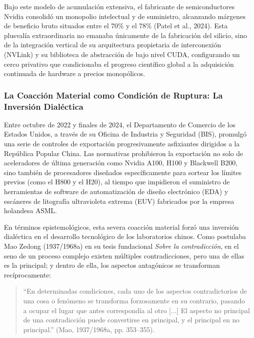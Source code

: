 Bajo este modelo de acumulación extensiva, el fabricante de semiconductores Nvidia consolidó un monopolio intelectual y de suministro, alcanzando márgenes de beneficio bruto situados entre el 70\% y el 78\% (Patel et al., 2024). Esta plusvalía extraordinaria no emanaba únicamente de la fabricación del silicio, sino de la integración vertical de su arquitectura propietaria de interconexión (NVLink) y su biblioteca de abstracción de bajo nivel CUDA, configurando un cerco privativo que condicionaba el progreso científico global a la adquisición continuada de hardware a precios monopólicos.

\subsubsection{La Coacción Material como Condición de Ruptura: La Inversión Dialéctica}

Entre octubre de 2022 y finales de 2024, el Departamento de Comercio de los Estados Unidos, a través de su Oficina de Industria y Seguridad (BIS), promulgó una serie de controles de exportación progresivamente asfixiantes dirigidos a la República Popular China. Las normativas prohibieron la exportación no solo de aceleradores de última generación como Nvidia A100, H100 y Blackwell B200, sino también de procesadores diseñados específicamente para sortear los límites previos (como el H800 y el H20), al tiempo que impidieron el suministro de herramientas de software de automatización de diseño electrónico (EDA) y escáneres de litografía ultravioleta extrema (EUV) fabricados por la empresa holandesa ASML.

En términos epistemológicos, esta severa coacción material forzó una inversión dialéctica en el desarrollo tecnológico de los laboratorios chinos. Como postulaba Mao Zedong (1937/1968a) en su tesis fundacional \textit{Sobre la contradicción}, en el seno de un proceso complejo existen múltiples contradicciones, pero una de ellas es la principal; y dentro de ella, los aspectos antagónicos se transforman recíprocamente:

\begin{quote}
``En determinadas condiciones, cada uno de los aspectos contradictorios de una cosa o fenómeno se transforma forzosamente en su contrario, pasando a ocupar el lugar que antes correspondía al otro [...] El aspecto no principal de una contradicción puede convertirse en principal, y el principal en no principal.'' (Mao, 1937/1968a, pp. 353--355).
\end{quote}

